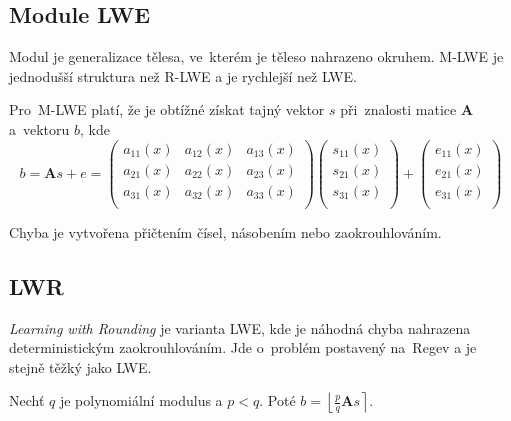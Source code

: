 \subsection{Module LWE}

Modul je generalizace tělesa, ve~kterém je těleso\footnotemark{} nahrazeno okruhem\footnotemark{}.
M-LWE je jednodušší struktura než R-LWE a je rychlejší než LWE.

Pro~M-LWE platí, že je obtížné získat tajný vektor $s$ při~znalosti matice \textbf{A} a~vektoru $b$, kde
$$
b =
\textbf{A}s + e =
\left(\begin{matrix}
a_{11}(x) & a_{12}(x) & a_{13}(x) \\
a_{21}(x) & a_{22}(x) & a_{23}(x) \\
a_{31}(x) & a_{32}(x) & a_{33}(x) \\
\end{matrix}\right) \left(\begin{matrix}
s_{11}(x) \\ s_{21}(x) \\ s_{31}(x) \\
\end{matrix}\right) + \left(\begin{matrix}
e_{11}(x) \\ e_{21}(x) \\ e_{31}(x) \\
\end{matrix}\right)
$$

Chyba je vytvořena přičtením čísel, násobením nebo zaokrouhlováním.


\subsection{LWR}

\emph{Learning with Rounding} je varianta LWE, kde je náhodná chyba nahrazena deterministickým zaokrouhlováním.
Jde o~problém postavený na~Regev a je stejně těžký jako LWE.

Nechť $q$ je polynomiální modulus a $p < q$.
Poté $b = \left\lfloor \frac{p}{q} \textbf{A}s \right\rceil$.

